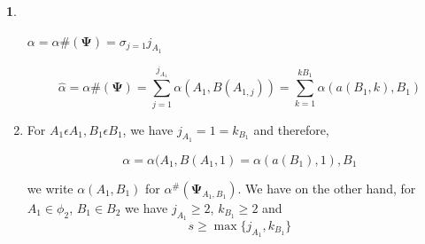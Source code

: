 \documentclass[a4paper,12pt]{article}
\theoremstyle{definition}
\theoremstyle{underlinethm}
\theoremstyle{definition}
\newtheorem{subsubsec}{}[subsection]
\begin{document}
\begin{subsubsec}
\begin{enumerate}[label=(\alph*)]
$\alpha=\alpha \# (\boldsymbol{\Psi})= \sigma_{j=1} j_{A_{1}}$

\begin{equation}
\hat{\alpha} = \alpha \# (\boldsymbol{\Psi}) = \sum_{j=1}^{j_{A_{1}}} \alpha (A_{1}, B(A_{1, j})) = \sum_{k=1}^{kB_{1}} \alpha (a(B_{1}, k), B_{1})\tag{4.4}\label{eq-4.4}
\end{equation}

\item For $A_{1} \epsilon A_{1}, B_{1} \epsilon B_{1}$, we have $j_{A_{1}}=1=k_{B_{1}}$ and therefore,

\begin{equation}
\alpha = \alpha (A_{1}, B(A_{1}, 1)= \alpha(a(B_{1}), 1), B_{1}\tag{4.5}\label{eq-4.5}
\end{equation}

we write $\alpha(A_{1}, B_{1})$ for $\alpha^{\#}(\boldsymbol{\Psi}_{A_{1}, B_{1}})$. We have on the other hand, for $A_{1} \in \phi_{2}$, $B_{1} \in B_{2}$ we have $j_{A_{1}} \geq 2$, $k_{B_{1}}\geq 2$ and 
\begin{equation}
s \geq \max\{j_{A_{1}}, k_{B_{1}}\}\tag{4.6}\label{eq-4.6}
\end{equation}
\end{enumerate}

\end{subsubsec}
\end{document}
